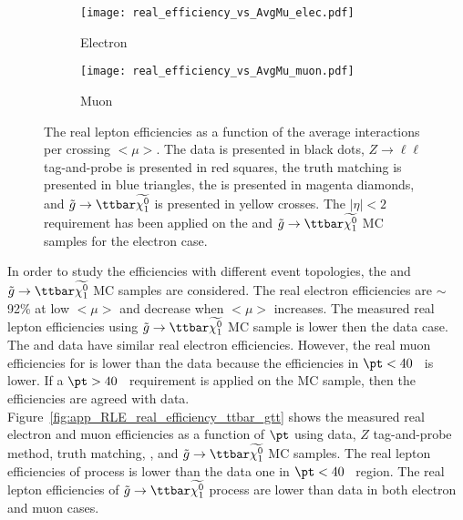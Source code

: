 \begin{figure}[htb]
    \begin{subfigure}[b]{0.48\textwidth}
        \begin{center}
            \texttt{[image: real\_efficiency\_vs\_AvgMu\_elec.pdf]}
            \caption{Electron}
        \end{center}
    \end{subfigure}
    \begin{subfigure}[b]{0.48\textwidth}
        \begin{center}
            \texttt{[image: real\_efficiency\_vs\_AvgMu\_muon.pdf]}
            \caption{Muon}
        \end{center}
    \end{subfigure}
    \caption{The real lepton efficiencies as a function of the average interactions per crossing $<\mu>$.
    The data is presented in black dots,  $Z\to \ell\ell$ tag-and-probe is presented in red squares, the truth matching is presented in blue triangles, the \ttbar is presented in magenta diamonds, and $\tilde{g} \to \ttbar \widetilde{\chi^{0}_{1}}$ is presented in yellow crosses.
    The $|\eta|<2$ requirement has been applied on the \ttbar and $\tilde{g} \to \ttbar \widetilde{\chi^{0}_{1}}$ MC samples for the electron case.}
\label{fig:app_RLE_vs_pileup}
\end{figure}

In order to study the efficiencies with different event topologies, the \ttbar and $\tilde{g} \to \ttbar \widetilde{\chi^{0}_{1}}$ MC samples are considered.
The real electron efficiencies are $\sim$92\% at low $<\mu>$ and decrease when $<\mu>$ increases.
The measured real lepton efficiencies using $\tilde{g} \to \ttbar \widetilde{\chi^{0}_{1}}$ MC sample is lower then the data case.
The \ttbar and data have similar real electron efficiencies.
However, the real muon efficiencies for \ttbar is lower than the data because the efficiencies in $\pt < 40$~{\GeV} is lower.
If a $\pt > 40$~{\GeV} requirement is applied on the \ttbar MC sample, then the efficiencies are agreed with data.
Figure~\ref{fig:app_RLE_real_efficiency_ttbar_gtt} shows the measured real electron and muon efficiencies as a function of $\pt$ using data, $Z$ tag-and-probe method, truth matching, \ttbar, and $\tilde{g} \to \ttbar \widetilde{\chi^{0}_{1}}$ MC samples.
The real lepton efficiencies of \ttbar process is lower than the data one in $\pt < 40$~{\GeV} region.
The real lepton efficiencies of $\tilde{g} \to \ttbar \widetilde{\chi^{0}_{1}}$ process are lower than data in both electron and muon cases.


